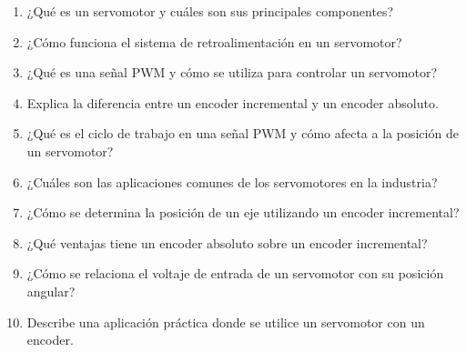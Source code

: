 \documentclass[../main]{subfiles}
\begin{document}

\begin{enumerate}
    \item ¿Qué es un servomotor y cuáles son sus principales componentes?
    \item ¿Cómo funciona el sistema de retroalimentación en un servomotor?
    \item ¿Qué es una señal PWM y cómo se utiliza para controlar un servomotor?
    \item Explica la diferencia entre un encoder incremental y un encoder absoluto.
    \item ¿Qué es el ciclo de trabajo en una señal PWM y cómo afecta a la posición de un servomotor?
    \item ¿Cuáles son las aplicaciones comunes de los servomotores en la industria?
    \item ¿Cómo se determina la posición de un eje utilizando un encoder incremental?
    \item ¿Qué ventajas tiene un encoder absoluto sobre un encoder incremental?
    \item ¿Cómo se relaciona el voltaje de entrada de un servomotor con su posición angular?
    \item Describe una aplicación práctica donde se utilice un servomotor con un encoder.
\end{enumerate}

\end{document}

